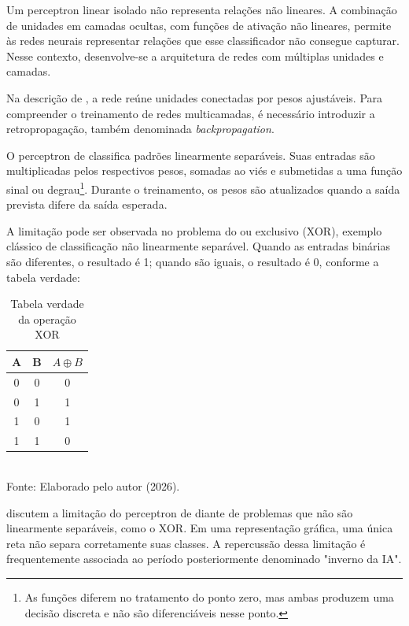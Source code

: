 Um perceptron linear isolado não representa relações não lineares. A combinação de unidades em camadas ocultas, com funções de ativação não lineares, permite às redes neurais representar relações que esse classificador não consegue capturar. Nesse contexto, desenvolve-se a arquitetura de redes com múltiplas unidades e camadas.

Na descrição de , a rede reúne unidades conectadas por pesos ajustáveis. Para compreender o treinamento de redes multicamadas, é necessário introduzir a retropropagação, também denominada \textit{backpropagation}.

O perceptron de  classifica padrões linearmente separáveis. Suas entradas são multiplicadas pelos respectivos pesos, somadas ao viés e submetidas a uma função sinal ou degrau\footnote{As funções diferem no tratamento do ponto zero, mas ambas produzem uma decisão discreta e não são diferenciáveis nesse ponto.}. Durante o treinamento, os pesos são atualizados quando a saída prevista difere da saída esperada.

A limitação pode ser observada no problema do ou exclusivo (XOR), exemplo clássico de classificação não linearmente separável. Quando as entradas binárias são diferentes, o resultado é 1; quando são iguais, o resultado é 0, conforme a tabela verdade:

\begin{table}[htb]
	\centering
	\captionsetup{justification=centering}
	\caption{Tabela verdade da operação XOR}
	\label{tab:xor}
	\begin{tabular}{ccc}
		\hline
		A & B & $A \oplus B$ \\
		\hline
		0 & 0 & 0 \\
		0 & 1 & 1 \\
		1 & 0 & 1 \\
		1 & 1 & 0 \\
		\hline
	\end{tabular}
	\\[0.2cm]
	\footnotesize Fonte: Elaborado pelo autor (2026).
\end{table}

 discutem a limitação do perceptron de  diante de problemas que não são linearmente separáveis, como o XOR. Em uma representação gráfica, uma única reta não separa corretamente suas classes. A repercussão dessa limitação é frequentemente associada ao período posteriormente denominado "inverno da IA".

